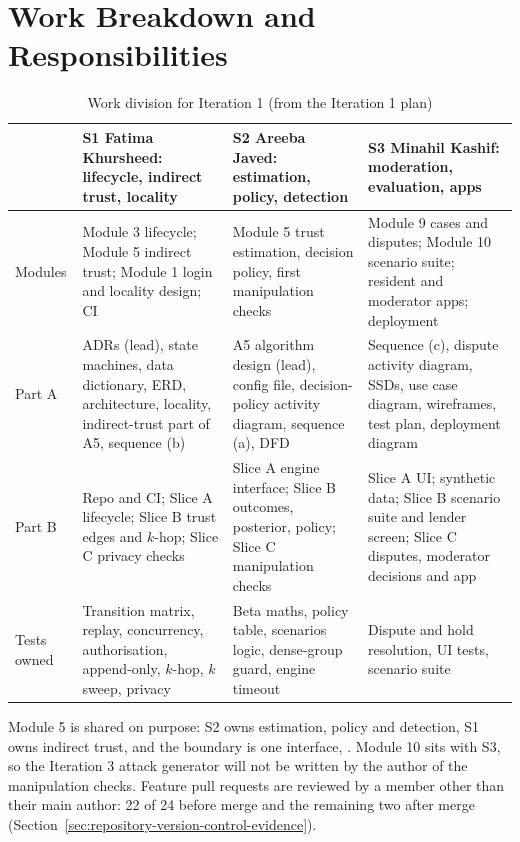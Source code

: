 \section{Work Breakdown and Responsibilities}\label{sec:work-breakdown-responsibilities}
\begin{table}[H]
\centering
\caption{Work division for Iteration 1 (from the Iteration 1 plan)}\label{tab:work-division-iteration-1}
\begin{tabular}{@{}L{51pt}L{102pt}L{102pt}L{99pt}@{}}
\toprule
 & S1 Fatima Khursheed: lifecycle, indirect trust, locality & S2 Areeba Javed: estimation, policy, detection & S3 Minahil Kashif: moderation, evaluation, apps \\
\midrule
Modules & Module 3 lifecycle; Module 5 indirect trust; Module 1 login and locality design; CI & Module 5 trust estimation, decision policy, first manipulation checks & Module 9 cases and disputes; Module 10 scenario suite; resident and moderator apps; deployment \\
Part A & ADRs (lead), state machines, data dictionary, ERD, architecture, locality, indirect-trust part of A5, sequence (b) & A5 algorithm design (lead), config file, decision-policy activity diagram, sequence (a), DFD & Sequence (c), dispute activity diagram, SSDs, use case diagram, wireframes, test plan, deployment diagram \\
Part B & Repo and CI; Slice A lifecycle; Slice B trust edges and $k$-hop; Slice C privacy checks & Slice A engine interface; Slice B outcomes, posterior, policy; Slice C manipulation checks & Slice A UI; synthetic data; Slice B scenario suite and lender screen; Slice C disputes, moderator decisions and app \\
Tests owned & Transition matrix, replay, concurrency, authorisation, append-only, $k$-hop, $k$ sweep, privacy & Beta maths, policy table, scenarios logic, dense-group guard, engine timeout & Dispute and hold resolution, UI tests, scenario suite \\
\bottomrule
\end{tabular}
\end{table}
Module 5 is shared on purpose: S2 owns estimation, policy and detection, S1 owns indirect trust, and the boundary is one interface, . Module 10 sits with S3, so the Iteration 3 attack generator will not be written by the author of the manipulation checks. Feature pull requests are reviewed by a member other than their main author: 22 of 24 before merge and the remaining two after merge (Section~\ref{sec:repository-version-control-evidence}).

